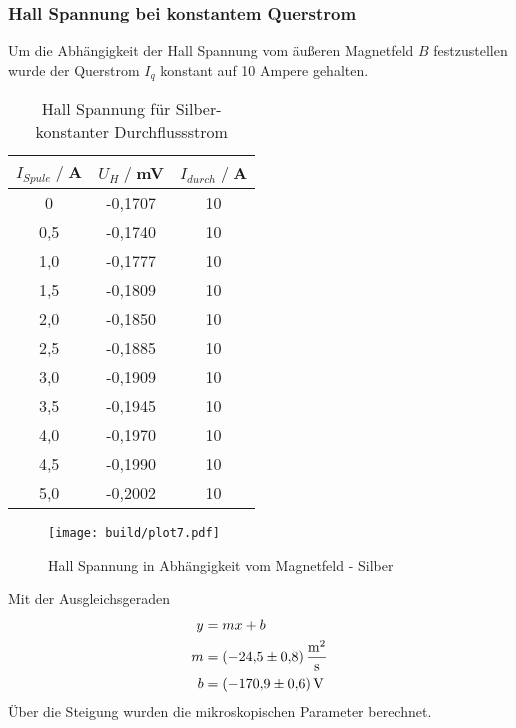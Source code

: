 \subsubsection{Hall Spannung bei konstantem Querstrom}
Um die Abhängigkeit der Hall Spannung vom äußeren Magnetfeld $B$ festzustellen wurde der Querstrom $I_q$ konstant auf 10 Ampere gehalten.
\begin{table}[H]
    \centering
    \begin{tabular}{c c c}
        \toprule
        $I_{Spule} \;/\;$A & $U_H\;/\;$mV & $I_{durch} \;/\;$A\\
        \midrule
            0                   &-0,1707&             10\\
            0,5                 &-0,1740&             10\\
            1,0                 &-0,1777&             10\\
            1,5                 &-0,1809&             10\\
            2,0                 &-0,1850&             10\\
            2,5                 &-0,1885&             10\\
            3,0                 &-0,1909&             10\\
            3,5                 &-0,1945&             10\\
            4,0                 &-0,1970&             10\\
            4,5                 &-0,1990&             10\\
            5,0                 &-0,2002&             10\\
       \bottomrule
    \end{tabular}
    \caption{Hall Spannung für Silber- konstanter Durchflussstrom}
    \label{tab:Ag_I}
\end{table}
\begin{figure}[H]
    \centering
    \texttt{[image: build/plot7.pdf]}
    \caption{Hall Spannung in Abhängigkeit vom Magnetfeld - Silber}
    \label{fig:Ag_B}
\end{figure}
Mit der Ausgleichsgeraden
\begin{align*}
    y &= mx + b\\
    m &= \SI{-24,5 \pm 0,8}{\square \meter \per \second} \\
    b &= \SI{-170,9 \pm 0,6}{\volt} \\ 
\end{align*}
Über die Steigung wurden die mikroskopischen Parameter berechnet.
